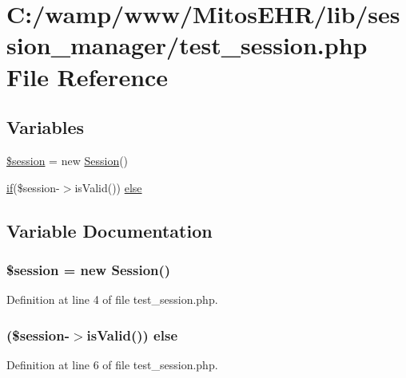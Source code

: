 \hypertarget{test__session_8php}{\section{\-C\-:/wamp/www/\-Mitos\-E\-H\-R/lib/session\-\_\-manager/test\-\_\-session.php \-File \-Reference}
\label{test__session_8php}
}
\subsection*{\-Variables}
\begin{DoxyCompactItemize}
\item 
\hyperlink{test__session_8php_abefb3c26429d514777313e9a63d7cbac}{\$session} = new \hyperlink{class_session}{\-Session}()
\item 
\hyperlink{_setup_8inc_8php_ad0184337b31d13763ec8751feff4aabe}{if}(\$session-\/$>$is\-Valid()) \hyperlink{test__session_8php_a7ca5c3b9e4c46ab37c0418e95ddcfa36}{else}
\end{DoxyCompactItemize}


\subsection{\-Variable \-Documentation}
\hypertarget{test__session_8php_abefb3c26429d514777313e9a63d7cbac}{
\subsubsection[{\$session}]{\setlength{\rightskip}{0pt plus 5cm}\$session = new {\bf \-Session}()}}\label{test__session_8php_abefb3c26429d514777313e9a63d7cbac}


\-Definition at line 4 of file test\-\_\-session.\-php.

\hypertarget{test__session_8php_a7ca5c3b9e4c46ab37c0418e95ddcfa36}{
\subsubsection[{else}]{ (\$session-\/$>$is\-Valid()) {\bf else}}}\label{test__session_8php_a7ca5c3b9e4c46ab37c0418e95ddcfa36}


\-Definition at line 6 of file test\-\_\-session.\-php.

